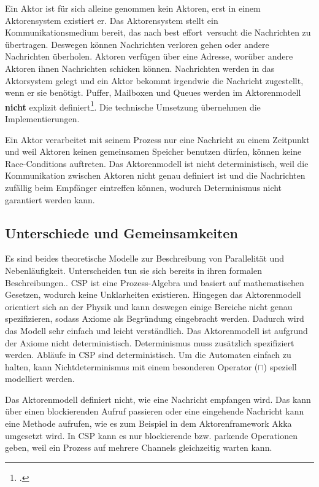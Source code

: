 Ein Aktor ist für sich alleine genommen kein Aktoren, erst in einem Aktorensystem existiert er. Das Aktorensystem stellt ein Kommunikationsmedium bereit, das nach \glqq best effort\grqq\ versucht die Nachrichten zu übertragen. Deswegen können Nachrichten verloren gehen oder andere Nachrichten überholen. Aktoren verfügen über eine Adresse, worüber andere Aktoren ihnen Nachrichten schicken können. Nachrichten werden in das Aktorsystem gelegt und ein Aktor bekommt irgendwie die Nachricht zugestellt, wenn er sie benötigt. Puffer, Mailboxen und Queues werden im Aktorenmodell \textbf{nicht} explizit definiert\footcite[Seite 3, Rechte Spalte]{ACTORSNEW}. Die technische Umsetzung übernehmen die Implementierungen.

Ein Aktor verarbeitet mit seinem Prozess nur eine Nachricht zu einem Zeitpunkt und weil Aktoren keinen gemeinsamen Speicher benutzen dürfen, können keine Race-Conditions auftreten.
Das Aktorenmodell ist nicht deterministisch, weil die Kommunikation zwischen Aktoren nicht genau definiert ist und die Nachrichten zufällig beim Empfänger eintreffen können, wodurch Determinismus nicht garantiert werden kann.

\subsection{Unterschiede und Gemeinsamkeiten}
Es sind beides theoretische Modelle zur Beschreibung von Parallelität und Nebenläufigkeit. Unterscheiden tun sie sich bereits in ihren formalen Beschreibungen..
\ac{CSP} ist eine Prozess-Algebra und basiert auf mathematischen Gesetzen, wodurch keine Unklarheiten existieren. Hingegen das Aktorenmodell orientiert sich an der Physik und kann deswegen einige Bereiche nicht genau spezifizieren, sodass Axiome als Begründung eingebracht werden. Dadurch wird das Modell sehr einfach und leicht verständlich. Das Aktorenmodell ist aufgrund der Axiome nicht deterministisch. Determinismus muss zusätzlich spezifiziert werden. Abläufe in \ac{CSP} sind deterministisch. Um die Automaten einfach zu halten, kann Nichtdeterminismus mit einem besonderen Operator ($\sqcap$) speziell modelliert werden.

Das Aktorenmodell definiert nicht, wie eine Nachricht empfangen wird. Das kann über einen blockierenden Aufruf passieren oder eine eingehende Nachricht kann eine Methode aufrufen, wie es zum Beispiel in dem Aktorenframework Akka umgesetzt wird. In \ac{CSP} kann es nur blockierende bzw. parkende Operationen geben, weil ein Prozess auf mehrere Channels gleichzeitig warten kann.

